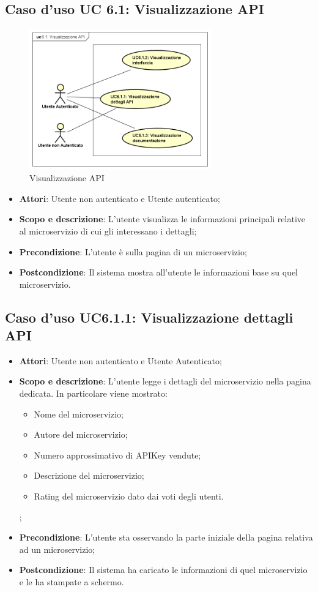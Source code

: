 \documentclass[12pt,a4paper,titlepage]{article}
\begin{document}
	\subsection{Caso d'uso UC 6.1: Visualizzazione API}
	\label{UC6.1}
	\begin{figure}[H]
		\centering
		\includegraphics[width=0.7\textwidth]{UseCase/VisualizzazioneAPI}
		\caption{Visualizzazione API}
	\end{figure}
	\begin{itemize}
		\item \textbf{Attori}: Utente non autenticato e Utente autenticato;
		\item \textbf{Scopo e descrizione}: L'utente visualizza le informazioni principali relative al microservizio di cui gli interessano i dettagli;
		\item \textbf{Precondizione}: L'utente è sulla pagina di un microservizio;
		\item \textbf{Postcondizione}: Il sistema mostra all'utente le informazioni base su quel microservizio.
	\end{itemize}
	\subsection{Caso d'uso UC6.1.1: Visualizzazione dettagli API}
	\label{UC6.1.1}
	\begin{itemize}
		\item \textbf{Attori}: Utente non autenticato e Utente Autenticato;
		\item \textbf{Scopo e descrizione}: L'utente legge i dettagli del microservizio nella pagina dedicata. In particolare viene mostrato:
		\begin{itemize}
			\item Nome del microservizio;
			\item Autore del microservizio;
			\item Numero approssimativo di APIKey vendute;
			\item Descrizione del microservizio;
			\item Rating del microservizio dato dai voti degli utenti.
		\end{itemize};
		\item \textbf{Precondizione}: L'utente sta osservando la parte iniziale della pagina relativa ad un microservizio;
		\item \textbf{Postcondizione}: Il sistema ha caricato le informazioni di quel microservizio e le ha stampate a schermo.
	\end{itemize}
\end{document}
